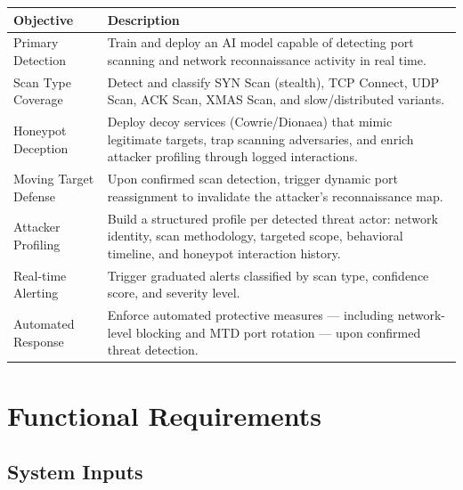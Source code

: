 \documentclass[12pt,a4paper]{article}
\begin{document}
\begin{table}[h!]
\centering
\small
\begin{tabular}{L{4cm} L{11cm}}
  \toprule
  \textbf{Objective} & \textbf{Description} \\
  \midrule
  Primary Detection     & Train and deploy an AI model capable of detecting port scanning and network reconnaissance activity in real time. \\
  Scan Type Coverage    & Detect and classify SYN Scan (stealth), TCP Connect, UDP Scan, ACK Scan, XMAS Scan, and slow/distributed variants. \\
  Honeypot Deception    & Deploy decoy services (Cowrie/Dionaea) that mimic legitimate targets, trap scanning adversaries, and enrich attacker profiling through logged interactions. \\
  Moving Target Defense & Upon confirmed scan detection, trigger dynamic port reassignment to invalidate the attacker's reconnaissance map. \\
  Attacker Profiling    & Build a structured profile per detected threat actor: network identity, scan methodology, targeted scope, behavioral timeline, and honeypot interaction history. \\
  Real-time Alerting    & Trigger graduated alerts classified by scan type, confidence score, and severity level. \\
  Automated Response    & Enforce automated protective measures --- including network-level blocking and MTD port rotation --- upon confirmed threat detection. \\
  \bottomrule
\end{tabular}
\end{table}


\section{Functional Requirements}

\subsection{System Inputs}
\end{document}
